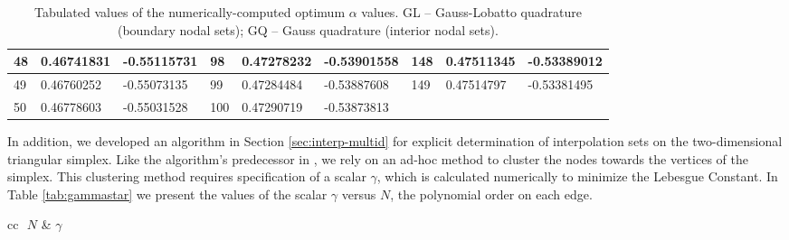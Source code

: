 \begin{table}[h]
\begin{center}
{\begin{tabular}{|l|l|l||l|l|l||l|l|l|}
    48 & 0.46741831 & -0.55115731 & 98 & 0.47278232 & -0.53901558 & 148 &
    0.47511345 & -0.53389012\\\hline
    49 & 0.46760252 & -0.55073135 & 99 & 0.47284484 & -0.53887608 & 149 &
    0.47514797 & -0.53381495\\\hline
    50 & 0.46778603 & -0.55031528 & 100 & 0.47290719 & -0.53873813 &  &  & \\\hline
  \end{tabular}
  }
  \end{center}
  \caption[Lebesgue-optimal values of $\alpha$ for boundary and interior nodal
  sets]{Tabulated values of the numerically-computed optimum $\alpha$
  values. GL -- Gauss-Lobatto quadrature (boundary nodal sets); GQ -- Gauss
  quadrature (interior nodal sets).}
  \label{tab:alphastar}
\end{table}

In addition, we developed an algorithm in Section \ref{sec:interp-multid} for
explicit determination of interpolation sets on the two-dimensional triangular
simplex. Like the algorithm's predecessor in {\cite{warburton2006}}, we rely on
an ad-hoc method to cluster the nodes towards the vertices of the simplex. This
clustering method requires specification of a scalar $\gamma$, which is
calculated numerically to minimize the Lebesgue Constant. In Table
\ref{tab:gammastar} we present the values of the scalar $\gamma$ versus $N$, the
polynomial order on each edge.

\begin{table}[h]
\begin{center}
  \begin{tabular}{cc} $\,\,N$ & $\gamma$ \\
  \end{tabular}

  
\end{center}
\caption[Stretch parameter values for two-dimensional Jacobi warp and blend
algorithm]{Tabulated values of the stretch paramter $\gamma$ necessary for
calculation of the nodal sets presented in Section \ref{sec:interp-multid}.}
\label{tab:gammastar}
\end{table}
